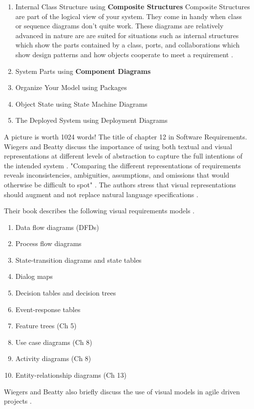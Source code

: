 \documentclass{acm_proc_article-sp}
\begin{document}
\begin{enumerate}
	\item Internal Class Structure using \textbf{Composite Structures}
	\newline
	Composite Structures are part of the logical view of your system. They come in handy when class or sequence diagrams don't quite work. These diagrams are relatively advanced in nature are are suited for situations such as internal structures which show the parts contained by a class, ports, and collaborations which show design patterns and how objects cooperate to meet a requirement \cite{Lamport:UML}.
	\item System Parts using \textbf{Component Diagrams}
	
	
	\item Organize Your Model using Packages
	\item Object State using State Machine Diagrams
	\item The Deployed System using Deployment Diagrams
\end{enumerate}
A picture is worth 1024 words! The title of chapter 12 in Software Requirements. Wiegers and Beatty discuss the importance of using both textual and visual representations at different levels of abstraction to capture the full intentions of the intended system \cite{Lamport:SoftwareRequirements}. "Comparing the different representations of requirements reveals inconsistencies, ambiguities, assumptions, and omissions that would otherwise be difficult to spot" \cite{Lamport:SoftwareRequirements}. The authors stress that visual representations should augment and not replace natural language specifications \cite{Lamport:SoftwareRequirements}.

Their book describes the following visual requirements models \cite{Lamport:SoftwareRequirements}.
\begin{enumerate}
	\item Data flow diagrams (DFDs)
	
	\item Process flow diagrams 
	\item State-transition diagrams and state tables
	\item Dialog maps
	\item Decision tables and decision trees
	\item Event-response tables
	\item Feature trees (Ch 5)
	\item Use case diagrams (Ch 8)
	\item Activity diagrams (Ch 8)
	\item Entity-relationship diagrams (Ch 13)
\end{enumerate}
Wiegers and Beatty also briefly discuss the use of visual models in agile driven projects \cite{Lamport:SoftwareRequirements}.
\end{document}
